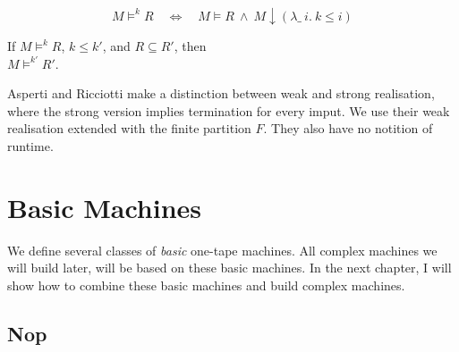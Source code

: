 \begin{lemma}
  \label{lem:Realise_total}
  \[
    M \vDash^k R
    \quad\iff\quad
    M \vDash R ~\land~
    M \downarrow (\lambda \_~i.~k \le i)
  \]
\end{lemma}

\begin{lemma}
  \label{lem:Realise_monotone}
  If $M \vDash^k R$, $k \leq k'$, and $R \subseteq R'$, then \\
  $M \vDash^{k'} R'$.
\end{lemma}

Asperti and Ricciotti \cite{asperti2015} make a distinction between weak and strong realisation, where the strong version implies termination for
every imput.  We use their weak realisation extended with the finite partition $F$.  They also have no notition of runtime.


\section{Basic Machines}
\label{sec:basic_machines}


We define several classes of \emph{basic} one-tape machines.  All complex machines we will build later, will be based on these basic machines.  In the
next chapter, I will show how to combine these basic machines and build complex machines.


\subsection{Nop}
\label{sec:basic_machines-Nop}

